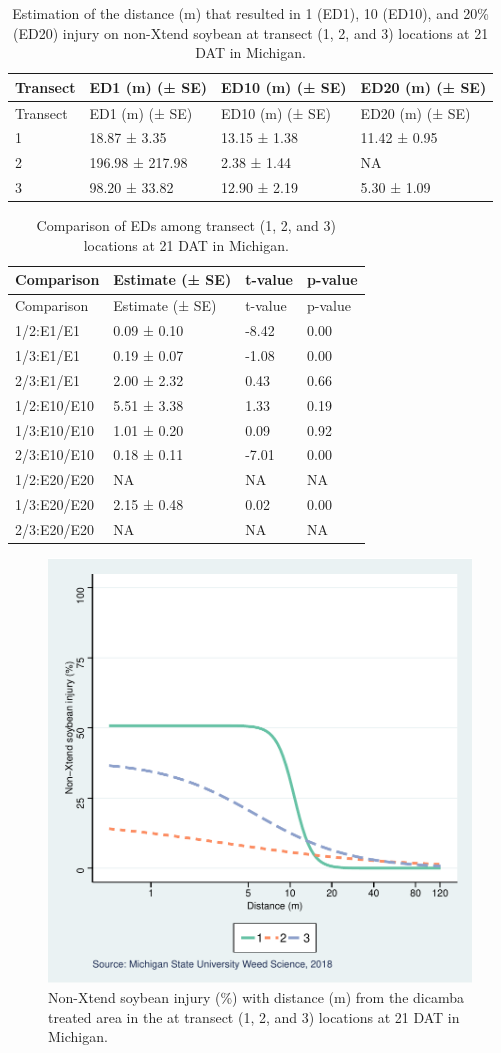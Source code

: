 \documentclass[]{article}
\begin{document}
\begin{longtable}[]{@{}llll@{}}
\caption{Estimation of the distance (m) that resulted in 1 (ED1), 10
(ED10), and 20\% (ED20) injury on non-Xtend soybean at transect (1, 2,
and 3) locations at 21 DAT in Michigan.}\tabularnewline
\toprule
Transect & ED1 (m) (± SE) & ED10 (m) (± SE) & ED20 (m) (±
SE)\tabularnewline
\midrule
\endfirsthead
\toprule
Transect & ED1 (m) (± SE) & ED10 (m) (± SE) & ED20 (m) (±
SE)\tabularnewline
\midrule
\endhead
1 & 18.87 ± 3.35 & 13.15 ± 1.38 & 11.42 ± 0.95\tabularnewline
2 & 196.98 ± 217.98 & 2.38 ± 1.44 & NA\tabularnewline
3 & 98.20 ± 33.82 & 12.90 ± 2.19 & 5.30 ± 1.09\tabularnewline
\bottomrule
\end{longtable}

\begin{longtable}[]{@{}llll@{}}
\caption{Comparison of EDs among transect (1, 2, and 3) locations at 21
DAT in Michigan.}\tabularnewline
\toprule
Comparison & Estimate (± SE) & t-value & p-value\tabularnewline
\midrule
\endfirsthead
\toprule
Comparison & Estimate (± SE) & t-value & p-value\tabularnewline
\midrule
\endhead
1/2:E1/E1 & 0.09 ± 0.10 & -8.42 & 0.00\tabularnewline
1/3:E1/E1 & 0.19 ± 0.07 & -1.08 & 0.00\tabularnewline
2/3:E1/E1 & 2.00 ± 2.32 & 0.43 & 0.66\tabularnewline
1/2:E10/E10 & 5.51 ± 3.38 & 1.33 & 0.19\tabularnewline
1/3:E10/E10 & 1.01 ± 0.20 & 0.09 & 0.92\tabularnewline
2/3:E10/E10 & 0.18 ± 0.11 & -7.01 & 0.00\tabularnewline
1/2:E20/E20 & NA & NA & NA\tabularnewline
1/3:E20/E20 & 2.15 ± 0.48 & 0.02 & 0.00\tabularnewline
2/3:E20/E20 & NA & NA & NA\tabularnewline
\bottomrule
\end{longtable}

\begin{figure}
\centering
\includegraphics{Report_files/figure-latex/unnamed-chunk-59-1.pdf}
\caption{Non-Xtend soybean injury (\%) with distance (m) from the
dicamba treated area in the at transect (1, 2, and 3) locations at 21
DAT in Michigan.}
\end{figure}
\end{document}
